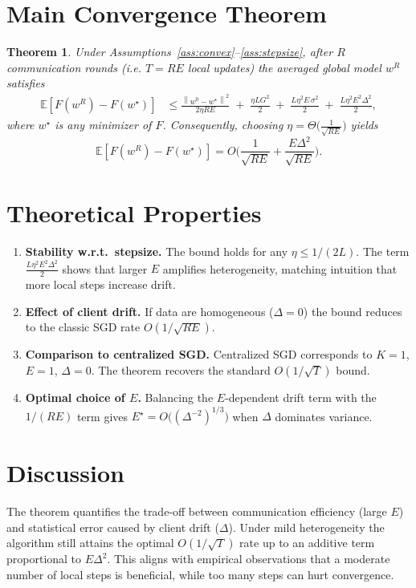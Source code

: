 \documentclass{article}
\newtheorem{theorem}{Theorem}
\newcommand{\E}{\mathbb{E}}
\newcommand{\norm}[1]{\left\lVert#1\right\rVert}
\begin{document}
\section*{Main Convergence Theorem}
\begin{theorem}\label{thm:main}
Under Assumptions~\ref{ass:convex}–\ref{ass:stepsize}, after $R$ communication rounds (i.e. $T=RE$ local updates) the averaged global model $w^{R}$ satisfies
\[
\boxed{
\begin{aligned}
    \E\!\left[F(w^{R})-F(w^{\star})\right]
    &\le
    \frac{\norm{w^{0}-w^{\star}}^{2}}{2\eta RE}
    \;+\;
    \frac{\eta L G^{2}}{2}
    \;+\;
    \frac{L\eta^{2}E\,\sigma^{2}}{2}
    \;+\;
    \frac{L\eta^{2}E^{2}\Delta^{2}}{2},
\end{aligned}}
\]
where $w^{\star}$ is any minimizer of $F$. Consequently, choosing $\eta=\Theta\!\big(\frac{1}{\sqrt{RE}}\big)$ yields
\[
    \E\!\left[F(w^{R})-F(w^{\star})\right]=O\!\Big(\frac{1}{\sqrt{RE}}+\frac{E\Delta^{2}}{\sqrt{RE}}\Big).
\]
\end{theorem}

\section*{Theoretical Properties}
\begin{enumerate}[label=\arabic*.]
    \item \textbf{Stability w.r.t.\ stepsize.} The bound holds for any $\eta\le1/(2L)$.  The term $\frac{L\eta^{2}E^{2}\Delta^{2}}{2}$ shows that larger $E$ amplifies heterogeneity, matching intuition that more local steps increase drift.
    \item \textbf{Effect of client drift.} If data are homogeneous ($\Delta=0$) the bound reduces to the classic SGD rate $O(1/\sqrt{RE})$.
    \item \textbf{Comparison to centralized SGD.} Centralized SGD corresponds to $K=1$, $E=1$, $\Delta=0$.  The theorem recovers the standard $O(1/\sqrt{T})$ bound.
    \item \textbf{Optimal choice of $E$.} Balancing the $E$‑dependent drift term with the $1/(RE)$ term gives $E^{\star}=O\!\big((\Delta^{-2})^{1/3}\big)$ when $\Delta$ dominates variance.
\end{enumerate}

\section*{Discussion}
The theorem quantifies the trade‑off between communication efficiency (large $E$) and statistical error caused by client drift ($\Delta$).  Under mild heterogeneity the algorithm still attains the optimal $O(1/\sqrt{T})$ rate up to an additive term proportional to $E\Delta^{2}$.  This aligns with empirical observations that a moderate number of local steps is beneficial, while too many steps can hurt convergence.
\end{document}
